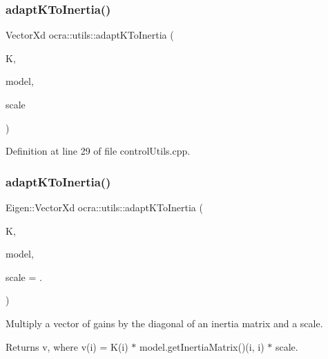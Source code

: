 \subsubsection{\texorpdfstring{adapt\+K\+To\+Inertia()}{adaptKToInertia()}\hspace{0.1cm}{\footnotesize\ttfamily [1/2]}}
{\footnotesize\ttfamily Vector\+Xd ocra\+::utils\+::adapt\+K\+To\+Inertia (\begin{DoxyParamCaption}\item[{const Vector\+Xd \&}]{K,  }\item[{const \hyperlink{classocra_1_1Model}{Model} \&}]{model,  }\item[{double}]{scale }\end{DoxyParamCaption})}



Definition at line 29 of file control\+Utils.\+cpp.

\hypertarget{namespaceocra_1_1utils_ad8e0359ef8aba5d4f7de70014e9ab324}{}\label{namespaceocra_1_1utils_ad8e0359ef8aba5d4f7de70014e9ab324} 
\subsubsection{\texorpdfstring{adapt\+K\+To\+Inertia()}{adaptKToInertia()}\hspace{0.1cm}{\footnotesize\ttfamily [2/2]}}
{\footnotesize\ttfamily Eigen\+::\+Vector\+Xd ocra\+::utils\+::adapt\+K\+To\+Inertia (\begin{DoxyParamCaption}\item[{const Eigen\+::\+Vector\+Xd \&}]{K,  }\item[{const \hyperlink{classocra_1_1Model}{Model} \&}]{model,  }\item[{double}]{scale = {.} }\end{DoxyParamCaption})}

Multiply a vector of gains by the diagonal of an inertia matrix and a scale. \begin{DoxyReturn}{Returns}
v, where v(i) = K(i) $\ast$ model.\+get\+Inertia\+Matrix()(i, i) $\ast$ scale. 
\end{DoxyReturn}
\hypertarget{namespaceocra_1_1utils_ad4dfd96e7620a1cadabe53db0cdf969d}{}\label{namespaceocra_1_1utils_ad4dfd96e7620a1cadabe53db0cdf969d} 
